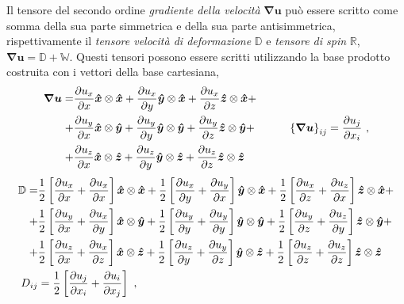 Il tensore del secondo ordine \textit{gradiente della velocità} $\bm{\nabla} \bm{u}$ può essere scritto come somma della sua parte simmetrica e della sua parte antisimmetrica, rispettivamente il \textit{tensore velocità di deformazione} $\mathbb{D}$ e \textit{tensore di spin} $\mathbb{R}$, $\bm{\nabla} \bm{u} = \mathbb{D} + \mathbb{W}$. Questi tensori possono essere scritti utilizzando la base prodotto costruita con i vettori della base cartesiana,
\begin{equation}\label{eqn:grad}
\begin{aligned}
 \bm{\nabla} \bm{u} = & \dfrac{\partial{u_x}}{\partial{x}} \bm{\hat{x}}\otimes\bm{\hat{x}} + 
                        \dfrac{\partial{u_x}}{\partial{y}} \bm{\hat{y}}\otimes\bm{\hat{x}} +
                        \dfrac{\partial{u_x}}{\partial{z}} \bm{\hat{z}}\otimes\bm{\hat{x}} + \\
                    + & \dfrac{\partial{u_y}}{\partial{x}} \bm{\hat{x}}\otimes\bm{\hat{y}} +
                        \dfrac{\partial{u_y}}{\partial{y}} \bm{\hat{y}}\otimes\bm{\hat{y}} +
                        \dfrac{\partial{u_y}}{\partial{z}} \bm{\hat{z}}\otimes\bm{\hat{y}} + \\
                    + & \dfrac{\partial{u_z}}{\partial{x}} \bm{\hat{x}}\otimes\bm{\hat{z}} +
                        \dfrac{\partial{u_z}}{\partial{y}} \bm{\hat{y}}\otimes\bm{\hat{z}} +
                        \dfrac{\partial{u_z}}{\partial{z}} \bm{\hat{z}}\otimes\bm{\hat{z}}
\end{aligned} \hspace{1.0cm}
 \left\{ \bm{\nabla}\bm{u} \right\}_{ij} = \dfrac{\partial{u_j}}{\partial{x_i}} \ ,
\end{equation}
\begin{equation}\label{eqn:d}
\begin{aligned}
 \mathbb{D} = & \frac{1}{2}\left[ \dfrac{\partial{u_x}}{\partial{x}} +  \dfrac{\partial{u_x}}{\partial{x}} \right] \bm{\hat{x}}\otimes\bm{\hat{x}} + 
                \frac{1}{2}\left[ \dfrac{\partial{u_x}}{\partial{y}} +  \dfrac{\partial{u_y}}{\partial{x}} \right] \bm{\hat{y}}\otimes\bm{\hat{x}} +
                \frac{1}{2}\left[ \dfrac{\partial{u_x}}{\partial{z}} +  \dfrac{\partial{u_z}}{\partial{x}} \right] \bm{\hat{z}}\otimes\bm{\hat{x}} + \\
            + & \frac{1}{2}\left[ \dfrac{\partial{u_y}}{\partial{x}} +  \dfrac{\partial{u_x}}{\partial{y}} \right] \bm{\hat{x}}\otimes\bm{\hat{y}} +
                \frac{1}{2}\left[ \dfrac{\partial{u_y}}{\partial{y}} +  \dfrac{\partial{u_y}}{\partial{y}} \right] \bm{\hat{y}}\otimes\bm{\hat{y}} +
                \frac{1}{2}\left[ \dfrac{\partial{u_y}}{\partial{z}} +  \dfrac{\partial{u_z}}{\partial{y}} \right] \bm{\hat{z}}\otimes\bm{\hat{y}} + \\
            + & \frac{1}{2}\left[ \dfrac{\partial{u_z}}{\partial{x}} +  \dfrac{\partial{u_x}}{\partial{z}} \right] \bm{\hat{x}}\otimes\bm{\hat{z}} +
                \frac{1}{2}\left[ \dfrac{\partial{u_z}}{\partial{y}} +  \dfrac{\partial{u_y}}{\partial{z}} \right] \bm{\hat{y}}\otimes\bm{\hat{z}} +
                \frac{1}{2}\left[ \dfrac{\partial{u_z}}{\partial{z}} +  \dfrac{\partial{u_z}}{\partial{z}} \right] \bm{\hat{z}}\otimes\bm{\hat{z}} \\
  D_{ij} & = \dfrac{1}{2}\left[ \dfrac{\partial{u_j}}{\partial{x_i}} + \dfrac{\partial{u_i}}{\partial{x_j}} \right] \ ,
\end{aligned}
\end{equation}
